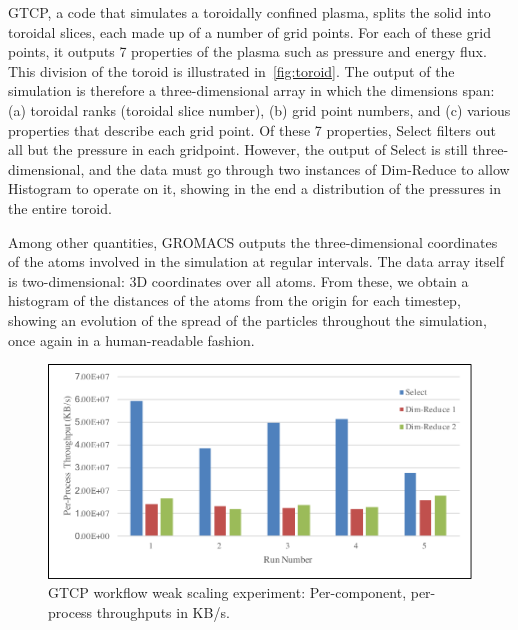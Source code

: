 GTCP, a code that simulates a toroidally confined plasma, splits the solid into
toroidal slices, each made up of a number of grid points. For each of these
grid points, it outputs 7 properties of the plasma such as pressure and energy
flux. This division of the toroid is illustrated in~\autoref{fig:toroid}.
The output of the simulation is therefore a three-dimensional array in which
the dimensions span: (a) toroidal ranks (toroidal slice number), (b) grid point
numbers, and (c) various properties that describe each grid point.
Of these 7 properties, Select filters out all but the pressure in each gridpoint.
However, the output of Select is still three-dimensional, and the
data must go through two instances of Dim-Reduce to allow
Histogram to operate on it, showing in the end
a distribution of the pressures in the entire toroid.

Among other quantities, GROMACS outputs
the three-dimensional coordinates
of the atoms involved in the simulation
at regular intervals.
The data array itself is two-dimensional:
3D coordinates over all atoms.
From these, we obtain a histogram of the distances
of the atoms from the origin for each timestep, showing
an evolution of the spread of the particles throughout
the simulation, once again in a human-readable fashion.

\begin{figure}
\includegraphics[width=\columnwidth]{fig/per-component-throughput}
\caption{GTCP workflow weak scaling experiment: Per-component, per-process throughputs in KB/s.}
\label{fig:gtcp-weak-perc}
\end{figure}

